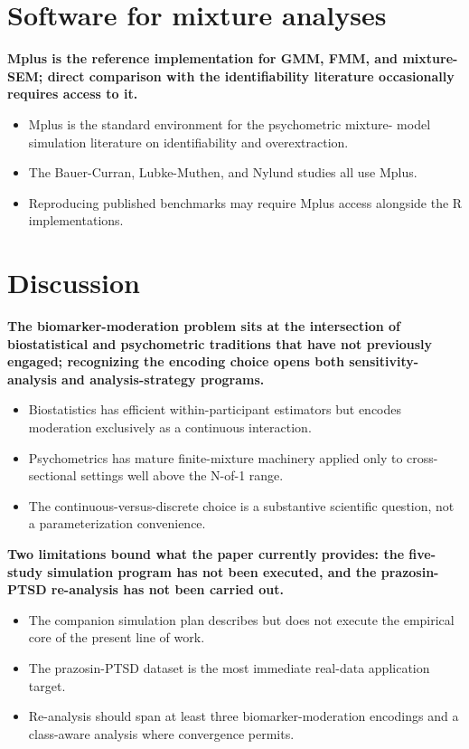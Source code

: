 \documentclass[
  11pt,
]{article}
\begin{document}
\section{Software for mixture analyses}\label{software-for-mixture-analyses}

\textbf{Mplus is the reference implementation for GMM, FMM, and
mixture-SEM; direct comparison with the identifiability literature
occasionally requires access to it.}

\begin{itemize}\setlength{\itemsep}{2pt}\setlength{\parskip}{0pt}
\item Mplus is the standard environment for the psychometric mixture-
  model simulation literature on identifiability and overextraction.
\item The Bauer-Curran, Lubke-Muthen, and Nylund studies all use
  Mplus.
\item Reproducing published benchmarks may require Mplus access
  alongside the R implementations.
\end{itemize}

\section{Discussion}\label{discussion}

\textbf{The biomarker-moderation problem sits at the intersection of
biostatistical and psychometric traditions that have not previously
engaged; recognizing the encoding choice opens both sensitivity-analysis
and analysis-strategy programs.}

\begin{itemize}\setlength{\itemsep}{2pt}\setlength{\parskip}{0pt}
\item Biostatistics has efficient within-participant estimators but
  encodes moderation exclusively as a continuous interaction.
\item Psychometrics has mature finite-mixture machinery applied only
  to cross-sectional settings well above the N-of-1 range.
\item The continuous-versus-discrete choice is a substantive
  scientific question, not a parameterization convenience.
\end{itemize}

\textbf{Two limitations bound what the paper currently provides: the
five-study simulation program has not been executed, and the
prazosin-PTSD re-analysis has not been carried out.}

\begin{itemize}\setlength{\itemsep}{2pt}\setlength{\parskip}{0pt}
\item The companion simulation plan describes but does not execute
  the empirical core of the present line of work.
\item The prazosin-PTSD dataset is the most immediate real-data
  application target.
\item Re-analysis should span at least three biomarker-moderation
  encodings and a class-aware analysis where convergence permits.
\end{itemize}
\end{document}

